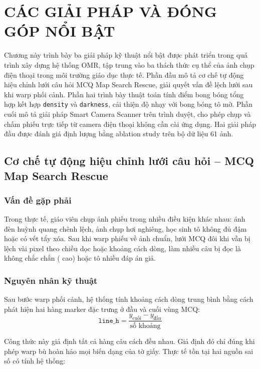 \chapter{CÁC GIẢI PHÁP VÀ ĐÓNG GÓP NỔI BẬT}

Chương này trình bày ba giải pháp kỹ thuật nổi bật được phát triển trong quá trình xây dựng hệ thống OMR, tập trung vào ba thách thức cụ thể của ảnh chụp điện thoại trong môi trường giáo dục thực tế. Phần đầu mô tả cơ chế tự động hiệu chỉnh lưới câu hỏi MCQ Map Search Rescue, giải quyết vấn đề lệch lưới sau khi warp phối cảnh. Phần hai trình bày thuật toán tính điểm bong bóng tổng hợp kết hợp \texttt{density} và \texttt{darkness}, cải thiện độ nhạy với bong bóng tô mờ. Phần cuối mô tả giải pháp Smart Camera Scanner trên trình duyệt, cho phép chụp và chấm phiếu trực tiếp từ camera điện thoại không cần cài ứng dụng. Hai giải pháp đầu được đánh giá định lượng bằng ablation study trên bộ dữ liệu 61 ảnh.

\section{Cơ chế tự động hiệu chỉnh lưới câu hỏi -- MCQ Map Search Rescue}
\label{sec:mcq-rescue}
\subsection{Vấn đề gặp phải}

Trong thực tế, giáo viên chụp ảnh phiếu trong nhiều điều kiện khác nhau: ánh đèn huỳnh quang chênh lệch, ảnh chụp hơi nghiêng, học sinh tô không đủ đậm hoặc có vết tẩy xóa. Sau khi warp phiếu về ảnh chuẩn, lưới MCQ đôi khi vẫn bị lệch vài pixel theo chiều dọc hoặc khoảng cách dòng, làm nhiều câu bị đọc là không chắc chắn ( cao) hoặc tô nhiều đáp án giả.

\subsection{Nguyên nhân kỹ thuật}

Sau bước warp phối cảnh, hệ thống tính khoảng cách dòng trung bình bằng cách phát hiện hai hàng marker đặc trưng ở đầu và cuối vùng MCQ:
$$\texttt{line\_h} = \frac{y_{\text{cuối}} - y_{\text{đầu}}}{\text{số khoảng}}$$

Công thức này giả định tất cả hàng câu cách đều nhau. Giả định đó chỉ đúng khi phép warp bù hoàn hảo mọi biến dạng của tờ giấy. Thực tế tồn tại hai nguồn sai số có tính hệ thống:

